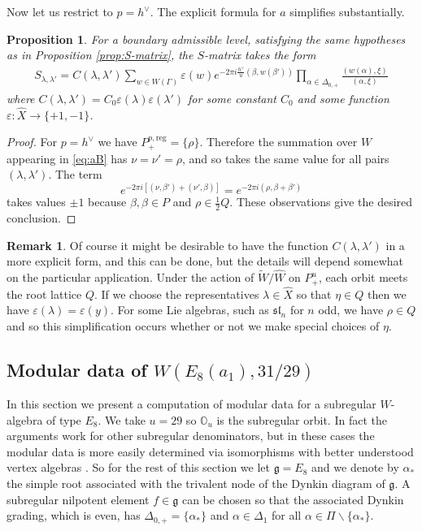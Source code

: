 \documentclass[12pt]{amsart}
\theoremstyle{plain}
\newtheorem{prop}[thm]{Proposition}
\theoremstyle{definition}
\newtheorem{rem}[thm]{Remark}
\numberwithin{equation}{section}
\newcommand{\laset}{\widehat{X}}
\newcommand{\al}{\alpha}
\newcommand{\la}{\lambda}
\newcommand{\D}{\Delta}
\newcommand{\g}{\mathfrak{g}}
\newcommand{\sll}{\mathfrak{sl}}
\newcommand{\alstar}{{\alpha_*}}
\newcommand{\fing}{\g}
\newcommand{\mbo}{\mathbb{O}}
\begin{document}
Now let us restrict to $p=h^\vee$. The explicit formula for $a$ simplifies substantially. 
\begin{prop}\label{prop:S-matrix-boundary}
For a boundary admissible level, satisfying the same hypotheses as in Proposition \ref{prop:S-matrix}, the $S$-matrix takes the form
\begin{align}\label{eq:S.orig.firstsimp}
S_{\la, \la'} = C(\la, \la') \sum_{w \in W(\Gamma)} \varepsilon(w) e^{-2\pi i \frac{h^\vee}{u} (\beta, w(\beta'))} \prod_{\al \in \D_{0, +}} \frac{(w(\al), \xi)}{(\al, \xi)}
\end{align}
where $C(\la, \la') = C_0 \varepsilon(\la) \varepsilon(\la')$ for some constant $C_0$ and some function $\varepsilon : \widehat{X} \rightarrow \{+1, -1\}$.
\end{prop}

\begin{proof}
For $p=h^\vee$ we have $P_+^{p, \text{reg}} = \{\rho\}$. Therefore the summation over $W$ appearing in \eqref{eq:aB} has $\nu = \nu'= \rho$, and so takes the same value for all pairs $(\la, \la')$. The term
\[
e^{-2\pi i [(\nu, \beta') + (\nu', \beta)]} = e^{-2\pi i (\rho, \beta + \beta')}
\]
takes values $\pm 1$ because $\beta, \beta \in P$ and $\rho \in \frac{1}{2}Q$. These observations give the desired conclusion.
\end{proof}

\begin{rem}
Of course it might be desirable to have the function $C(\la, \la')$ in a more explicit form, and this can be done, but the details will depend somewhat on the particular application. Under the action of $\widetilde{W} / \widehat{W}$ on $P_{+}^u$, each orbit meets the root lattice $Q$. If we choose the representatives $\la \in \laset$ so that $\eta \in Q$ then we have $\varepsilon(\la) = \varepsilon(y)$. For some Lie algebras, such as $\sll_n$ for $n$ odd, we have $\rho \in Q$ and so this simplification occurs whether or not we make special choices of $\eta$.
\end{rem}



\subsection{Modular data of $W(E_8(a_1), 31/29)$}\label{subsec:W29Smat}

In this section we present a computation of modular data for a subregular $W$-algebra of type $E_8$. We take $u=29$ so $\mbo_u$ is the subregular orbit. In fact the arguments work for other subregular denominators, but in these cases the modular data is more easily determined via isomorphisms with better understood vertex algebras \cite{vE-N}. So for the rest of this section we let $\fing = E_8$ and we denote by $\alstar$ the simple root associated with the trivalent node of the Dynkin diagram of $\fing$. A subregular nilpotent element $f \in \fing$ can be chosen so that the associated Dynkin grading, which is even, has $\D_{0, +} = \{\alstar\}$ and $\al \in \D_1$ for all $\al \in \Pi \backslash \{\alstar\}$.
\end{document}
